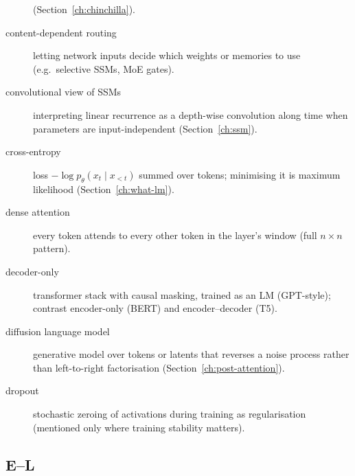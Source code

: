 \begin{description}
  (Section~\ref{ch:chinchilla}).
\item[content-dependent routing] letting network inputs decide which weights or
  memories to use (e.g.\ selective SSMs, MoE gates).
\item[convolutional view of SSMs] interpreting linear recurrence as a depth-wise
  convolution along time when parameters are input-independent (Section~\ref{ch:ssm}).
\item[cross-entropy] loss \(-\log p_\theta(x_t \mid x_{<t})\) summed over tokens;
  minimising it is maximum likelihood (Section~\ref{ch:what-lm}).
\item[dense attention] every token attends to every other token in the layer's
  window (full \(n \times n\) pattern).
\item[decoder-only] transformer stack with causal masking, trained as an LM
  (GPT-style); contrast encoder-only (BERT) and encoder--decoder (T5).
\item[diffusion language model] generative model over tokens or latents that
  reverses a noise process rather than left-to-right factorisation
  (Section~\ref{ch:post-attention}).
\item[dropout] stochastic zeroing of activations during training as regularisation
  (mentioned only where training stability matters).
\end{description}

\subsection*{E--L}

